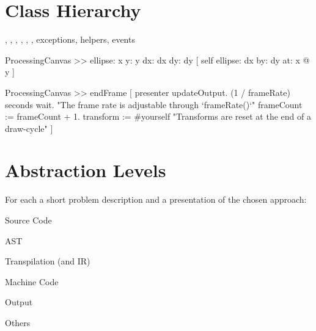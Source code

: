 \section{Class Hierarchy}

\begin{todo}
\item {}, , , , , ,  exceptions, helpers, events
\end{todo}


\begin{code}
ProcessingCanvas >> ellipse: x y: y dx: dx dy: dy [
	self
		ellipse: dx
		by: dy
		at: x @ y
]
\end{code}


\begin{code}
ProcessingCanvas >> endFrame [
	presenter updateOutput.
	(1 / frameRate) seconds wait.	"The frame rate is adjustable through `frameRate()`"
	frameCount := frameCount + 1.
	transform := #yourself	"Transforms are reset at the end of a draw-cycle"
]
\end{code}


\section{Abstraction Levels}
For each a short problem description and a presentation of the chosen approach:

\begin{todo}
\item Source Code
\item AST
\item Transpilation (and IR)
\item Machine Code
\item Output
\item Others
\end{todo}
